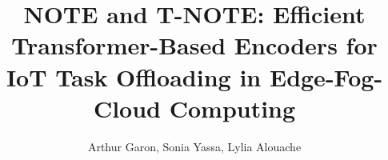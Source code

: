 \documentclass[preprint,3p,authoryear]{elsarticle}
\begin{document}
\begin{frontmatter}



\title{NOTE and T-NOTE: Efficient Transformer-Based Encoders for IoT Task Offloading in Edge-Fog-Cloud Computing} %

\author[arthur,sonia,lylia]{Arthur Garon, Sonia Yassa, Lylia Alouache}




% 


\end{frontmatter}
\end{document}
